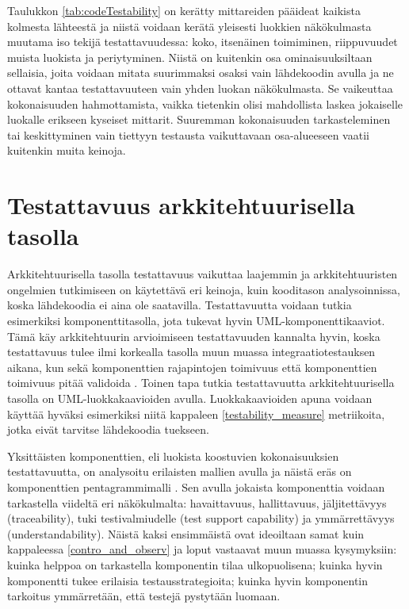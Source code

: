\documentclass[finnish]{tktltiki2}
\numberwithin{table}{section}
\theoremstyle{definition}
\theoremstyle{remark}
\begin{document}
\noindent
Taulukkon \ref{tab:codeTestability} on kerätty mittareiden pääideat kaikista kolmesta lähteestä ja niistä voidaan kerätä yleisesti luokkien näkökulmasta muutama iso tekijä testattavuudessa: koko, itsenäinen toimiminen, riippuvuudet muista luokista ja periytyminen. Niistä on kuitenkin osa ominaisuuksiltaan sellaisia, joita voidaan mitata suurimmaksi osaksi vain lähdekoodin avulla ja ne ottavat kantaa testattavuuteen vain yhden luokan näkökulmasta. Se vaikeuttaa kokonaisuuden hahmottamista, vaikka tietenkin olisi mahdollista laskea jokaiselle luokalle erikseen kyseiset mittarit. Suuremman kokonaisuuden tarkasteleminen tai keskittyminen vain tiettyyn testausta vaikuttavaan osa-alueeseen vaatii kuitenkin muita keinoja.

\section{Testattavuus arkkitehtuurisella tasolla} \label{arch_testability_main}

Arkkitehtuurisella tasolla testattavuus vaikuttaa laajemmin ja arkkitehtuuristen ongelmien tutkimiseen on käytettävä eri keinoja, kuin kooditason analysoinnissa, koska lähdekoodia ei aina ole saatavilla. Testattavuutta voidaan tutkia esimerkiksi komponenttitasolla, jota tukevat hyvin UML-komponenttikaaviot. Tämä käy arkkitehtuurin arvioimiseen testattavuuden kannalta hyvin, koska testattavuus tulee ilmi korkealla tasolla muun muassa integraatiotestauksen aikana, kun sekä komponenttien rajapintojen toimivuus että komponenttien toimivuus pitää validoida \citep[s. 65]{Eickelmann:1996:MOS:243327.243602}. Toinen tapa tutkia testattavuutta arkkitehtuurisella tasolla on UML-luokkakaavioiden avulla. Luokkakaavioiden apuna voidaan käyttää hyväksi esimerkiksi niitä kappaleen \ref{testability_measure} metriikoita, jotka eivät tarvitse lähdekoodia tuekseen. 

Yksittäisten komponenttien, eli luokista koostuvien kokonaisuuksien testattavuutta, on analysoitu erilaisten mallien avulla ja näistä eräs on komponenttien pentagrammimalli \citep{gao_component_2005}. Sen avulla jokaista komponenttia voidaan tarkastella viideltä eri näkökulmalta: havaittavuus, hallittavuus, jäljitettävyys (traceability), tuki testivalmiudelle (test support capability) ja ymmärrettävyys (understandability). Näistä kaksi ensimmäistä ovat ideoiltaan samat kuin kappaleessa \ref{contro_and_observ} ja loput vastaavat muun muassa kysymyksiin: kuinka helppoa on tarkastella komponentin tilaa ulkopuolisena; kuinka hyvin komponentti tukee erilaisia testausstrategioita; kuinka hyvin komponentin tarkoitus ymmärretään, että testejä pystytään luomaan. 
 
\end{document}

